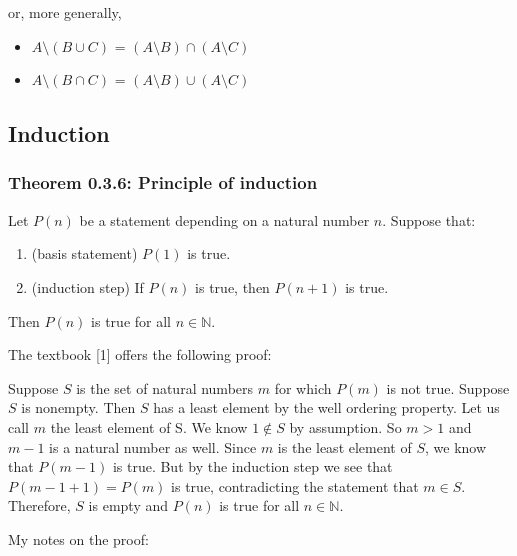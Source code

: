 \documentclass[12pt, letterpaper, oneside]{book}
\begin{document}
or, more generally,

\begin{itemize}
  \item $A \setminus (B \cup C)$ = $(A \setminus B) \cap (A \setminus C)$
  \item $A \setminus (B \cap C)$ = $(A \setminus B) \cup (A \setminus C)$
\end{itemize}

\subsection{Induction}

\subsubsection*{Theorem 0.3.6: Principle of induction}

Let $P(n)$ be a statement depending on a natural number $n$. Suppose that:

\begin{enumerate}
  \item (basis statement) $P(1)$ is true.
  \item (induction step) If $P(n)$ is true, then $P(n+1)$ is true.
\end{enumerate}

Then $P(n)$ is true for all $n \in \mathbb{N}$.

The textbook [1] offers the following proof:

\begin{displayquote}
  Suppose $S$ is the set of natural numbers $m$ for which $P(m)$ is not true.
  Suppose $S$ is nonempty. Then $S$ has a least element by the well ordering
  property. Let us call $m$ the least element of S. We know $1 \notin S$ by
  assumption. So $m > 1$ and $m - 1$ is a natural number as well. Since $m$ is
  the least element of $S$, we know that $P(m-1)$ is true. But by the induction
  step we see that $P(m-1+1) = P(m)$ is true, contradicting the statement that
  $m \in S$. Therefore, $S$ is empty and $P(n)$ is true for all $n \in
  \mathbb{N}$.
\end{displayquote}

My notes on the proof:
\end{document}
